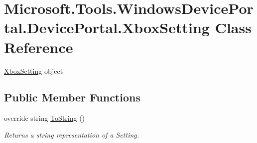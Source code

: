 \hypertarget{class_microsoft_1_1_tools_1_1_windows_device_portal_1_1_device_portal_1_1_xbox_setting}{}\section{Microsoft.\+Tools.\+Windows\+Device\+Portal.\+Device\+Portal.\+Xbox\+Setting Class Reference}
\label{class_microsoft_1_1_tools_1_1_windows_device_portal_1_1_device_portal_1_1_xbox_setting}


\hyperlink{class_microsoft_1_1_tools_1_1_windows_device_portal_1_1_device_portal_1_1_xbox_setting}{Xbox\+Setting} object  


\subsection*{Public Member Functions}
\begin{DoxyCompactItemize}
\item 
override string \hyperlink{class_microsoft_1_1_tools_1_1_windows_device_portal_1_1_device_portal_1_1_xbox_setting_a671534a5dbae7f0864fe7eecaf8e8c1b}{To\+String} ()
\begin{DoxyCompactList}\small\item\em Returns a string representation of a Setting. \end{DoxyCompactList}\end{DoxyCompactItemize}
